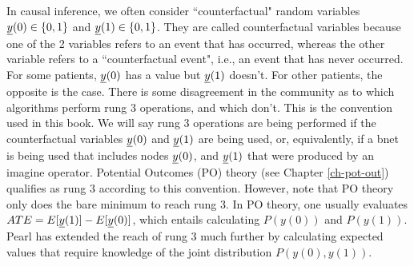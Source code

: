 In causal inference,
we often
consider  
``counterfactual"
random variables ${\underline{y}}(0)\in \{0,1\}$
and ${\underline{y}}(1)\in\{0,1\}$. They are called
counterfactual variables because
one of the 2 variables 
refers to an event that has occurred,
whereas the other variable
refers to a ``counterfactual  event",
i.e., an event that has never 
occurred. For some patients,
${\underline{y}}(0)$ has a value
but ${\underline{y}}(1)$
doesn't.
For other 
patients,
the opposite 
is the case.
There is some
disagreement in the
community
as to which algorithms
perform rung 3 operations,
and which don't.
This is the convention
used in this book.
We will
say rung 3 operations
are being performed 
if
the counterfactual variables ${\underline{y}}(0)$
and ${\underline{y}}(1)$
are being used,
or, equivalently,
if a bnet
is being used that
includes nodes ${\underline{y}}(0)$, and ${\underline{y}}(1)$
that were produced by an imagine operator.
Potential Outcomes (PO)
theory (see Chapter \ref{ch-pot-out})
qualifies as rung 3 according
to this convention.
However, note that PO theory 
only does the bare minimum 
to reach rung 3.
In PO theory, one usually
evaluates $ATE=E[{\underline{y}}(1)]-E[{\underline{y}}(0)]$,
which entails
calculating $P(y(0))$
and $P(y(1))$.
Pearl has extended the reach of rung 3
much further 
by calculating expected
values that require knowledge of
the joint distribution $P(y(0), y(1))$.

